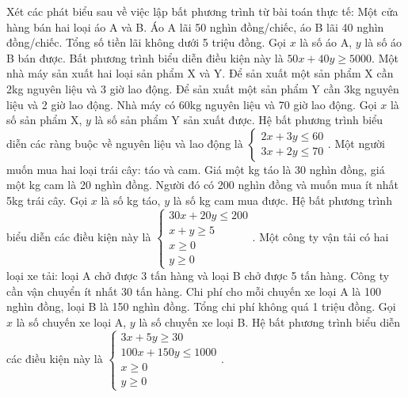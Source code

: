 \begin{ex}
Xét các phát biểu sau về việc lập bất phương trình từ bài toán thực tế:
\choiceTF
{Một cửa hàng bán hai loại áo A và B. Áo A lãi 50 nghìn đồng/chiếc, áo B lãi 40 nghìn đồng/chiếc. Tổng số tiền lãi không dưới 5 triệu đồng. Gọi $x$ là số áo A, $y$ là số áo B bán được. Bất phương trình biểu diễn điều kiện này là $50x + 40y \ge 5000$.}
{Một nhà máy sản xuất hai loại sản phẩm X và Y. Để sản xuất một sản phẩm X cần 2kg nguyên liệu và 3 giờ lao động. Để sản xuất một sản phẩm Y cần 3kg nguyên liệu và 2 giờ lao động. Nhà máy có 60kg nguyên liệu và 70 giờ lao động. Gọi $x$ là số sản phẩm X, $y$ là số sản phẩm Y sản xuất được. Hệ bất phương trình biểu diễn các ràng buộc về nguyên liệu và lao động là $\begin{cases} 2x + 3y \le 60 \\ 3x + 2y \le 70 \end{cases}$.}
{Một người muốn mua hai loại trái cây: táo và cam. Giá một kg táo là 30 nghìn đồng, giá một kg cam là 20 nghìn đồng. Người đó có 200 nghìn đồng và muốn mua ít nhất 5kg trái cây. Gọi $x$ là số kg táo, $y$ là số kg cam mua được. Hệ bất phương trình biểu diễn các điều kiện này là $\begin{cases} 30x + 20y \le 200 \\ x + y \ge 5 \\ x \ge 0 \\ y \ge 0 \end{cases}$.}
{Một công ty vận tải có hai loại xe tải: loại A chở được 3 tấn hàng và loại B chở được 5 tấn hàng. Công ty cần vận chuyển ít nhất 30 tấn hàng. Chi phí cho mỗi chuyến xe loại A là 100 nghìn đồng, loại B là 150 nghìn đồng. Tổng chi phí không quá 1 triệu đồng. Gọi $x$ là số chuyến xe loại A, $y$ là số chuyến xe loại B. Hệ bất phương trình biểu diễn các điều kiện này là $\begin{cases} 3x + 5y \ge 30 \\ 100x + 150y \le 1000 \\ x \ge 0 \\ y \ge 0 \end{cases}$.}
\end{ex}

